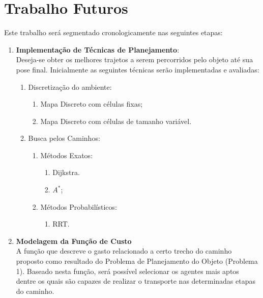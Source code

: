 \chapter{Trabalho Futuros} %
\label{cha:trabalho_futuros}

Este trabalho será segmentado cronologicamente nas seguintes etapas:

\begin{enumerate}

    \item \textbf{Implementação de Técnicas de Planejamento}:\\
        Deseja-se obter os melhores trajetos a serem percorridos pelo objeto até sua pose final. Inicialmente as seguintes técnicas serão implementadas e avaliadas:
            \begin{enumerate}
                \item Discretização do ambiente:
                    \begin{enumerate}
                        \item Mapa Discreto com células fixas;
                        \item Mapa Discreto com células de tamanho variável.
                    \end{enumerate}
                \item Busca pelos Caminhos:
                    \begin{enumerate}
                        \item Métodos Exatos:
                            \begin{enumerate}
                                \item Dijkstra.
                                \item $A^{*}$;
                            \end{enumerate}
                        \item Métodos Probabilísticos:
                            \begin{enumerate}
                                \item RRT.
                            \end{enumerate}
                    \end{enumerate}
            \end{enumerate}

    \item \textbf{Modelagem da Função de Custo}\\
    A função que descreve o gasto relacionado a certo trecho do caminho proposto como resultado do Problema de Planejamento do Objeto (Problema 1). Baseado nesta função, será possível selecionar os agentes mais aptos dentre os quais são capazes de realizar o transporte nas determinadas etapas do caminho.


\end{enumerate}
